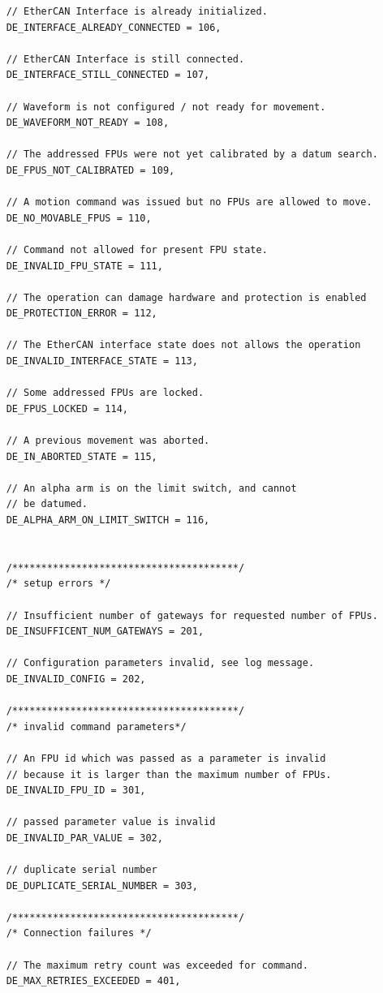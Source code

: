 \documentclass[11pt,a4paper]{scrartcl}
\begin{document}
\begin{verbatim}
    // EtherCAN Interface is already initialized.
    DE_INTERFACE_ALREADY_CONNECTED = 106,

    // EtherCAN Interface is still connected.
    DE_INTERFACE_STILL_CONNECTED = 107,

    // Waveform is not configured / not ready for movement.
    DE_WAVEFORM_NOT_READY = 108,

    // The addressed FPUs were not yet calibrated by a datum search.
    DE_FPUS_NOT_CALIBRATED = 109,

    // A motion command was issued but no FPUs are allowed to move.
    DE_NO_MOVABLE_FPUS = 110,

    // Command not allowed for present FPU state.
    DE_INVALID_FPU_STATE = 111,

    // The operation can damage hardware and protection is enabled
    DE_PROTECTION_ERROR = 112,

    // The EtherCAN interface state does not allows the operation
    DE_INVALID_INTERFACE_STATE = 113,

    // Some addressed FPUs are locked.
    DE_FPUS_LOCKED = 114,

    // A previous movement was aborted.
    DE_IN_ABORTED_STATE = 115,

    // An alpha arm is on the limit switch, and cannot
    // be datumed.
    DE_ALPHA_ARM_ON_LIMIT_SWITCH = 116,


    /***************************************/
    /* setup errors */

    // Insufficient number of gateways for requested number of FPUs.
    DE_INSUFFICENT_NUM_GATEWAYS = 201,

    // Configuration parameters invalid, see log message.
    DE_INVALID_CONFIG = 202,

    /***************************************/
    /* invalid command parameters*/

    // An FPU id which was passed as a parameter is invalid
    // because it is larger than the maximum number of FPUs.
    DE_INVALID_FPU_ID = 301,

    // passed parameter value is invalid
    DE_INVALID_PAR_VALUE = 302,

    // duplicate serial number
    DE_DUPLICATE_SERIAL_NUMBER = 303,

    /***************************************/
    /* Connection failures */

    // The maximum retry count was exceeded for command.
    DE_MAX_RETRIES_EXCEEDED = 401,


\end{verbatim}
\end{document}
